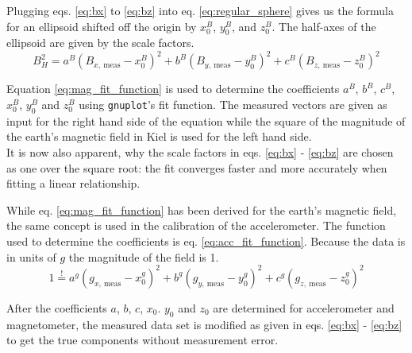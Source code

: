 Plugging eqs. \eqref{eq:bx} to \eqref{eq:bz} into eq. \eqref{eq:regular_sphere} gives us the formula for an ellipsoid shifted off the origin by $x_0^B$, $y_0^B$, and $z_0^B$. The half-axes of the ellipsoid are given by the scale factors.
\begin{equation}
    B_{H}^2=a^B(B_{x,\ \mathrm{meas}}-x_0^B)^2 + b^B(B_{y,\ \mathrm{meas}}-y_0^B)^2 + c^B(B_{z,\ \mathrm{meas}}-z_0^B)^2 
    \label{eq:mag_fit_function}
\end{equation}

 Equation \eqref{eq:mag_fit_function} is used to determine the coefficients $a^B$, $b^B$, $c^B$, $x_0^B$, $y_0^B$ and $z_0^B$ using \verb|gnuplot|'s fit function. The measured vectors are given as input for the right hand side of the equation while the square of the magnitude of the earth's magnetic field in Kiel is used for the left hand side.\\
It is now also apparent, why the scale factors in eqs. \eqref{eq:bx} - \eqref{eq:bz} are chosen as one over the square root: the fit converges faster and more accurately when fitting a linear relationship.

While eq. \eqref{eq:mag_fit_function} has been derived for the earth's magnetic field, the same concept is used in the calibration of the accelerometer. The function used to determine the coefficients is eq. \eqref{eq:acc_fit_function}. Because the data is in units of $g$ the magnitude of the field is 1.
\begin{equation}
    1\overset{!}{=}a^g(g_{x,\ \mathrm{meas}}-x_0^g)^2 + b^g(g_{y,\ \mathrm{meas}}-y_0^g)^2 + c^g(g_{z,\ \mathrm{meas}}-z_0^g)^2
    \label{eq:acc_fit_function}
\end{equation}

After the coefficients $a$, $b$, $c$, $x_0$. $y_0$ and $z_0$ are determined for accelerometer and magnetometer, the measured data set is modified as given in eqs. \eqref{eq:bx} - \eqref{eq:bz} to get the true components without measurement error.

